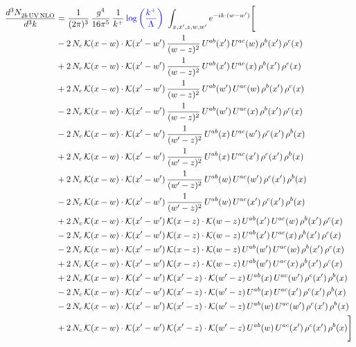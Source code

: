 \documentclass[9pt]{article}
\numberwithin{equation}{section}
\begin{document}
\begin{align}
\frac{d^{3}N_{2b\,\rm UV\, NLO}^{\rm}}{d^{3}k} & = \frac{1}{(2\pi)^{3}}\,\frac{g^{4}}{16\pi^{5}}\,\frac{1}{k^{+}}\,{\color{blue}\log{\left(\frac{k^{+}}{\Lambda}\right)}}\,\,\int_{x,x',z,w,w'}e^{-ik\cdot(w-w')}\Bigg[\notag\\ & -2\,N_{c}\,\mathcal{K}(x-w)\cdot\mathcal{K}(x'-w')\,\frac{1}{(w-z)^{2}}\,U^{ab}(x')\,U^{ac}(w)\,\rho^{b}(x')\,\rho^{c}(x)\notag\\
&+2\,N_{c}\,\mathcal{K}(x-w)\cdot\mathcal{K}(x'-w')\,\frac{1}{(w-z)^{2}}\,U^{ab}(x')\,U^{ac}(x)\,\rho^{b}(x')\,\rho^{c}(x)\notag\\
&+2\,N_{c}\,\mathcal{K}(x-w)\cdot\mathcal{K}(x'-w')\,\frac{1}{(w-z)^{2}}\,U^{ab}(w')\,U^{ac}(w)\,\rho^{b}(x')\,\rho^{c}(x)\notag\\
&-2\,N_{c}\,\mathcal{K}(x-w)\cdot\mathcal{K}(x'-w')\,\frac{1}{(w-z)^{2}}\,U^{ab}(w')\,U^{ac}(x)\,\rho^{b}(x')\,\rho^{c}(x)\notag\\
&-2\,N_{c}\,\mathcal{K}(x-w)\cdot\mathcal{K}(x'-w')\,\frac{1}{(w'-z)^{2}}\,U^{ab}(x)\,U^{ac}(w')\,\rho^{c}(x')\,\rho^{b}(x)\notag\\
&+2\,N_{c}\,\mathcal{K}(x-w)\cdot\mathcal{K}(x'-w')\,\frac{1}{(w'-z)^{2}}\,U^{ab}(x)\,U^{ac}(x')\,\rho^{c}(x')\,\rho^{b}(x)\notag\\
&+2\,N_{c}\,\mathcal{K}(x-w)\cdot\mathcal{K}(x'-w')\,\frac{1}{(w'-z)^{2}}\,U^{ab}(w)\,U^{ac}(w')\,\rho^{c}(x')\,\rho^{b}(x)\notag\\
&-2\,N_{c}\,\mathcal{K}(x-w)\cdot\mathcal{K}(x'-w')\,\frac{1}{(w'-z)^{2}}\,U^{ab}(w)\,U^{ac}(x')\,\rho^{c}(x')\,\rho^{b}(x)\notag\\
&+2\,N_{c}\,\mathcal{K}(x-w)\cdot\mathcal{K}(x'-w')\,\mathcal{K}(x-z)\cdot\mathcal{K}(w-z)\,U^{ab}(x')\,U^{ac}(w)\,\rho^{b}(x')\,\rho^{c}(x)\notag\\
&-2\,N_{c}\,\mathcal{K}(x-w)\cdot\mathcal{K}(x'-w')\,\mathcal{K}(x-z)\cdot\mathcal{K}(w-z)\,U^{ab}(x')\,U^{ac}(x)\,\rho^{b}(x')\,\rho^{c}(x)\notag\\
&-2\,N_{c}\,\mathcal{K}(x-w)\cdot\mathcal{K}(x'-w')\,\mathcal{K}(x-z)\cdot\mathcal{K}(w-z)\,U^{ab}(w')\,U^{ac}(w)\,\rho^{b}(x')\,\rho^{c}(x)\notag\\
&+2\,N_{c}\,\mathcal{K}(x-w)\cdot\mathcal{K}(x'-w')\,\mathcal{K}(x-z)\cdot\mathcal{K}(w-z)\,U^{ab}(w')\,U^{ac}(x)\,\rho^{b}(x')\,\rho^{c}(x)\notag\\
&+2\,N_{c}\,\mathcal{K}(x-w)\cdot\mathcal{K}(x'-w')\,\mathcal{K}(x'-z)\cdot\mathcal{K}(w'-z)\,U^{ab}(x)\,U^{ac}(w')\,\rho^{c}(x')\,\rho^{b}(x)\notag\\
&-2\,N_{c}\,\mathcal{K}(x-w)\cdot\mathcal{K}(x'-w')\,\mathcal{K}(x'-z)\cdot\mathcal{K}(w'-z)\,U^{ab}(x)\,U^{ac}(x')\,\rho^{c}(x')\,\rho^{b}(x)\notag\\
&-2\,N_{c}\,\mathcal{K}(x-w)\cdot\mathcal{K}(x'-w')\,\mathcal{K}(x'-z)\cdot\mathcal{K}(w'-z)\,U^{ab}(w)\,U^{ac}(w')\,\rho^{c}(x')\,\rho^{b}(x)\notag\\
&+2\,N_{c}\,\mathcal{K}(x-w)\cdot\mathcal{K}(x'-w')\,\mathcal{K}(x'-z)\cdot\mathcal{K}(w'-z)\,U^{ab}(w)\,U^{ac}(x')\,\rho^{c}(x')\,\rho^{b}(x)\Bigg]
\end{align}
\end{document}
